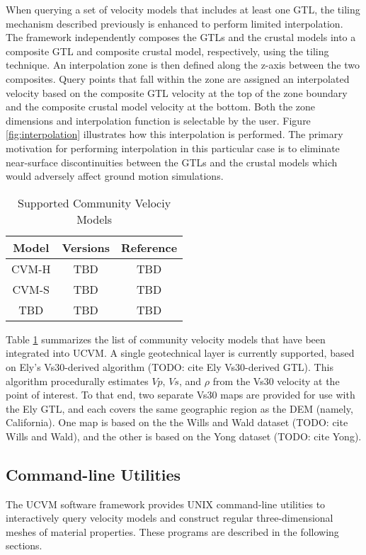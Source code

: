 When querying a set of velocity models that includes at least one GTL, the tiling mechanism described previously is enhanced to perform limited interpolation. The framework independently composes the GTLs and the crustal models into a composite GTL and composite crustal model, respectively, using the tiling technique. An interpolation zone is then defined along the z-axis between the two composites. Query points that fall within the zone are assigned an interpolated velocity based on the composite GTL velocity at the top of the zone boundary and the composite crustal model velocity at the bottom. Both the zone dimensions and interpolation function is selectable by the user. Figure \ref{fig:interpolation} illustrates how this interpolation is performed. The primary motivation for performing interpolation in this particular case is to eliminate near-surface discontinuities between the GTLs and the crustal models which would adversely affect ground motion simulations.
\begin{table}
\centering
\caption{Supported Community Velociy Models}\label{table:supported_models}
\begin{tabular}{|c|c|c|} \hline
Model & Versions & Reference \\ \hline
CVM-H & TBD & TBD \\ \hline
CVM-S & TBD & TBD \\ \hline
TBD & TBD & TBD \\
\hline\end{tabular}
\end{table}

Table \ref{table:supported_models} summarizes the list of community velocity models that have been integrated into UCVM. A single geotechnical layer is currently supported, based on Ely's Vs30-derived algorithm (TODO: cite Ely Vs30-derived GTL). This algorithm procedurally estimates $Vp$, $Vs$, and $\rho$ from the Vs30 velocity at the point of interest. To that end, two separate Vs30 maps are provided for use with the Ely GTL, and each covers the same geographic region as the DEM (namely, California). One map is based on the the Wills and Wald dataset (TODO: cite Wills and Wald), and the other is based on the Yong dataset (TODO: cite Yong). 

\subsection{Command-line Utilities}

The UCVM software framework provides UNIX command-line utilities to interactively query velocity models and construct regular three-dimensional meshes of material properties. These programs are described in the following sections.

